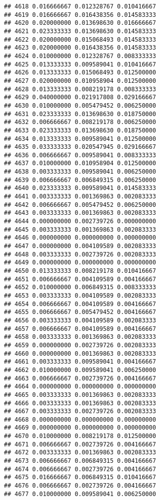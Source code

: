 \documentclass[
]{article}
\begin{document}
\begin{verbatim}
## 4618 0.016666667 0.012328767 0.010416667
## 4619 0.016666667 0.016438356 0.014583333
## 4620 0.020000000 0.013698630 0.016666667
## 4621 0.023333333 0.013698630 0.014583333
## 4622 0.020000000 0.015068493 0.014583333
## 4623 0.020000000 0.016438356 0.014583333
## 4624 0.010000000 0.012328767 0.008333333
## 4625 0.013333333 0.009589041 0.010416667
## 4626 0.013333333 0.015068493 0.012500000
## 4627 0.020000000 0.010958904 0.012500000
## 4628 0.013333333 0.008219178 0.008333333
## 4629 0.040000000 0.021917808 0.029166667
## 4630 0.010000000 0.005479452 0.006250000
## 4631 0.023333333 0.013698630 0.018750000
## 4632 0.006666667 0.008219178 0.006250000
## 4633 0.023333333 0.013698630 0.018750000
## 4634 0.013333333 0.009589041 0.012500000
## 4635 0.033333333 0.020547945 0.029166667
## 4636 0.006666667 0.009589041 0.008333333
## 4637 0.010000000 0.010958904 0.012500000
## 4638 0.003333333 0.009589041 0.006250000
## 4639 0.006666667 0.006849315 0.006250000
## 4640 0.023333333 0.009589041 0.014583333
## 4641 0.003333333 0.001369863 0.002083333
## 4642 0.006666667 0.005479452 0.006250000
## 4643 0.003333333 0.001369863 0.002083333
## 4644 0.000000000 0.002739726 0.000000000
## 4645 0.003333333 0.001369863 0.002083333
## 4646 0.000000000 0.000000000 0.000000000
## 4647 0.000000000 0.004109589 0.002083333
## 4648 0.003333333 0.002739726 0.002083333
## 4649 0.000000000 0.000000000 0.000000000
## 4650 0.013333333 0.008219178 0.010416667
## 4651 0.006666667 0.004109589 0.004166667
## 4652 0.010000000 0.006849315 0.008333333
## 4653 0.003333333 0.004109589 0.002083333
## 4654 0.006666667 0.004109589 0.004166667
## 4655 0.006666667 0.005479452 0.004166667
## 4656 0.003333333 0.004109589 0.002083333
## 4657 0.006666667 0.004109589 0.004166667
## 4658 0.003333333 0.001369863 0.002083333
## 4659 0.000000000 0.002739726 0.002083333
## 4660 0.000000000 0.001369863 0.002083333
## 4661 0.003333333 0.009589041 0.004166667
## 4662 0.010000000 0.009589041 0.006250000
## 4663 0.006666667 0.002739726 0.004166667
## 4664 0.000000000 0.000000000 0.000000000
## 4665 0.003333333 0.001369863 0.002083333
## 4666 0.003333333 0.001369863 0.002083333
## 4667 0.003333333 0.002739726 0.002083333
## 4668 0.000000000 0.000000000 0.000000000
## 4669 0.000000000 0.000000000 0.000000000
## 4670 0.010000000 0.008219178 0.012500000
## 4671 0.006666667 0.002739726 0.004166667
## 4672 0.003333333 0.001369863 0.002083333
## 4673 0.006666667 0.006849315 0.004166667
## 4674 0.006666667 0.002739726 0.004166667
## 4675 0.016666667 0.006849315 0.010416667
## 4676 0.006666667 0.002739726 0.004166667
## 4677 0.010000000 0.009589041 0.006250000

\end{verbatim}
\end{document}
